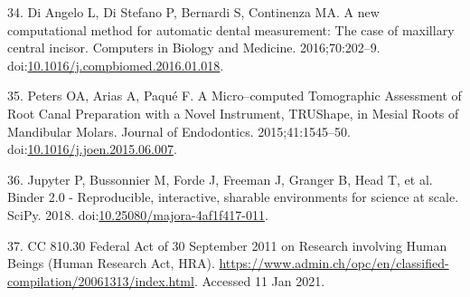 \documentclass[
  american,
]{article}
\newenvironment{cslreferences}%
  {}%
  {\par}
\begin{document}
\begin{cslreferences}
\leavevmode\hypertarget{ref-1Egw08k0d}{}%
34. Di Angelo L, Di Stefano P, Bernardi S, Continenza MA. A new computational method for automatic dental measurement: The case of maxillary central incisor. Computers in Biology and Medicine. 2016;70:202--9. doi:\href{https://doi.org/10.1016/j.compbiomed.2016.01.018}{10.1016/j.compbiomed.2016.01.018}.

\leavevmode\hypertarget{ref-RxErLYuw}{}%
35. Peters OA, Arias A, Paqué F. A Micro--computed Tomographic Assessment of Root Canal Preparation with a Novel Instrument, TRUShape, in Mesial Roots of Mandibular Molars. Journal of Endodontics. 2015;41:1545--50. doi:\href{https://doi.org/10.1016/j.joen.2015.06.007}{10.1016/j.joen.2015.06.007}.

\leavevmode\hypertarget{ref-Q20Bxdsr}{}%
36. Jupyter P, Bussonnier M, Forde J, Freeman J, Granger B, Head T, et al. Binder 2.0 - Reproducible, interactive, sharable environments for science at scale. SciPy. 2018. doi:\href{https://doi.org/10.25080/majora-4af1f417-011}{10.25080/majora-4af1f417-011}.

\leavevmode\hypertarget{ref-10OKzEtEb}{}%
37. CC 810.30 Federal Act of 30 September 2011 on Research involving Human Beings (Human Research Act, HRA). \url{https://www.admin.ch/opc/en/classified-compilation/20061313/index.html}. Accessed 11 Jan 2021.
\end{cslreferences}
\end{document}
